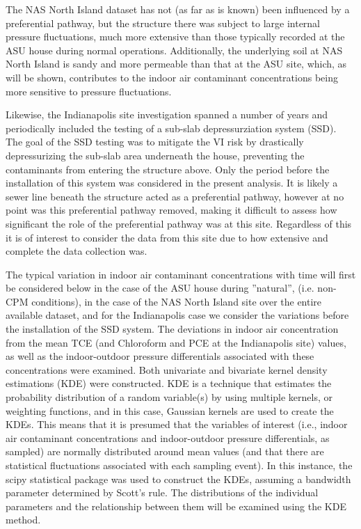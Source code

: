 \documentclass[journal=esthag,manuscript=article]{achemso}
\begin{document}
The NAS North Island dataset has not (as far as is known) been influenced by a preferential pathway, but the structure there was subject to large internal pressure fluctuations, much more extensive than those typically recorded at the ASU house during normal operations.
Additionally, the underlying soil at NAS North Island is sandy and more permeable than that at the ASU site, which, as will be shown, contributes to the indoor air contaminant concentrations being more sensitive to pressure fluctuations\cite{hosangadi_high-frequency_2017}. \par

Likewise, the Indianapolis site investigation spanned a number of years and periodically included the testing of a sub-slab depressurziation system (SSD).
The goal of the SSD testing was to mitigate the VI risk by drastically depressurizing the sub-slab area underneath the house, preventing the contaminants from entering the structure above.
Only the period before the installation of this system was considered in the present analysis.
It is likely a sewer line beneath the structure acted as a preferential pathway\cite{mchugh_evidence_2017}, however at no point was this preferential pathway removed, making it difficult to assess how significant the role of the preferential pathway was at this site.
Regardless of this it is of interest to consider the data from this site due to how extensive and complete the data collection was. \par

The typical variation in indoor air contaminant concentrations with time will first be considered below in the case of the ASU house during ”natural”, (i.e. non-CPM conditions), in the case of the NAS North Island site over the entire available dataset, and for the Indianapolis case we consider the variations before the installation of the SSD system.
The deviations in indoor air concentration from the mean TCE (and Chloroform and PCE at the Indianapolis site) values, as well as the indoor-outdoor pressure differentials associated with these concentrations were examined.
Both univariate and bivariate kernel density estimations (KDE) were constructed.
KDE is a technique that estimates the probability distribution of a random variable(s) by using multiple kernels, or weighting functions, and in this case, Gaussian kernels are used to create the KDEs.
This means that it is presumed that the variables of interest (i.e., indoor air contaminant concentrations and indoor-outdoor pressure differentials, as sampled) are normally distributed around mean values (and that there are statistical fluctuations associated with each sampling event).
In this instance, the scipy statistical package was used to construct the KDEs, assuming a bandwidth parameter determined by Scott's rule.
The distributions of the individual parameters and the relationship between them will be examined using the KDE method.
\end{document}
